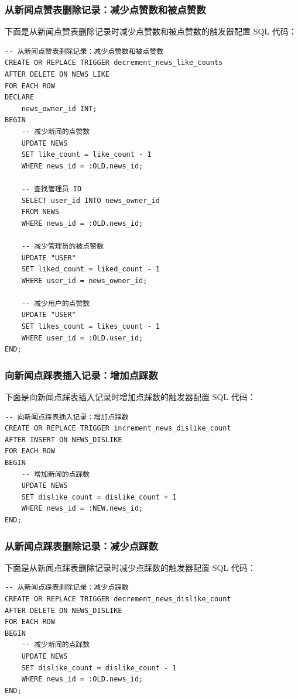 \subsubsection{从新闻点赞表删除记录：减少点赞数和被点赞数}

下面是从新闻点赞表删除记录时减少点赞数和被点赞数的触发器配置 SQL 代码：

\begin{verbatim}
-- 从新闻点赞表删除记录：减少点赞数和被点赞数
CREATE OR REPLACE TRIGGER decrement_news_like_counts
AFTER DELETE ON NEWS_LIKE
FOR EACH ROW
DECLARE
    news_owner_id INT;
BEGIN
    -- 减少新闻的点赞数
    UPDATE NEWS
    SET like_count = like_count - 1
    WHERE news_id = :OLD.news_id;

    -- 查找管理员 ID
    SELECT user_id INTO news_owner_id
    FROM NEWS
    WHERE news_id = :OLD.news_id;

    -- 减少管理员的被点赞数
    UPDATE "USER"
    SET liked_count = liked_count - 1
    WHERE user_id = news_owner_id;

    -- 减少用户的点赞数
    UPDATE "USER"
    SET likes_count = likes_count - 1
    WHERE user_id = :OLD.user_id;
END;
\end{verbatim}

\subsubsection{向新闻点踩表插入记录：增加点踩数}

下面是向新闻点踩表插入记录时增加点踩数的触发器配置 SQL 代码：

\begin{verbatim}
-- 向新闻点踩表插入记录：增加点踩数
CREATE OR REPLACE TRIGGER increment_news_dislike_count
AFTER INSERT ON NEWS_DISLIKE
FOR EACH ROW
BEGIN
    -- 增加新闻的点踩数
    UPDATE NEWS
    SET dislike_count = dislike_count + 1
    WHERE news_id = :NEW.news_id;
END;
\end{verbatim}

\subsubsection{从新闻点踩表删除记录：减少点踩数}

下面是从新闻点踩表删除记录时减少点踩数的触发器配置 SQL 代码：

\begin{verbatim}
-- 从新闻点踩表删除记录：减少点踩数
CREATE OR REPLACE TRIGGER decrement_news_dislike_count
AFTER DELETE ON NEWS_DISLIKE
FOR EACH ROW
BEGIN
    -- 减少新闻的点踩数
    UPDATE NEWS
    SET dislike_count = dislike_count - 1
    WHERE news_id = :OLD.news_id;
END;
\end{verbatim}

